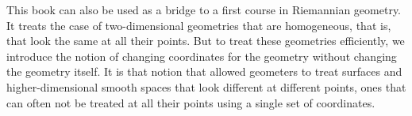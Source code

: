 \documentclass[handout]{ximera}
\begin{document}
\begin{remark}
This book can also be used as a bridge to a first course in Riemannian
geometry. It treats the case of two-dimensional geometries that are
homogeneous, that is, that look the same at all their points. But to treat
these geometries efficiently, we introduce the notion of changing coordinates
for the geometry without changing the geometry itself. It is that notion that
allowed geometers to treat surfaces and higher-dimensional smooth spaces that
look different at different points, ones that can often not be treated at all
their points using a single set of coordinates.
\end{remark}
\end{document}
